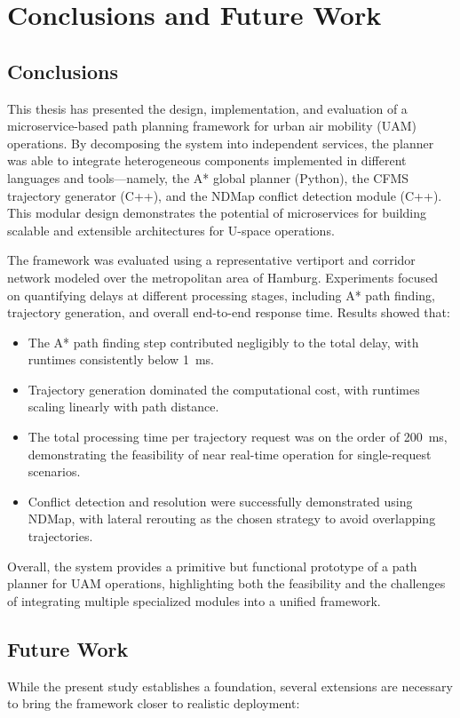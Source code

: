 \chapter{Conclusions and Future Work}
\label{s_conclusions}

\section{Conclusions}
This thesis has presented the design, implementation, and evaluation of a
microservice-based path planning framework for urban air mobility (UAM)
operations. By decomposing the system into independent services, the planner
was able to integrate heterogeneous components implemented in different
languages and tools—namely, the A* global planner (Python), the CFMS trajectory
generator (C++), and the NDMap conflict detection module (C++). This modular
design demonstrates the potential of microservices for building scalable and
extensible architectures for U-space operations.

The framework was evaluated using a representative vertiport and corridor
network modeled over the metropolitan area of Hamburg. Experiments focused on
quantifying delays at different processing stages, including A* path finding,
trajectory generation, and overall end-to-end response time. Results showed
that:
\begin{itemize}
    \item The A* path finding step contributed negligibly to the total delay,
    with runtimes consistently below 1~ms.
    \item Trajectory generation dominated the computational cost, with runtimes
    scaling linearly with path distance.
    \item The total processing time per trajectory request was on the order of
    200~ms, demonstrating the feasibility of near real-time operation for
    single-request scenarios.
    \item Conflict detection and resolution were successfully demonstrated using
    NDMap, with lateral rerouting as the chosen strategy to avoid overlapping
    trajectories.
\end{itemize}

Overall, the system provides a primitive but functional prototype of a path
planner for UAM operations, highlighting both the feasibility and the
challenges of integrating multiple specialized modules into a unified framework.

\section{Future Work}
While the present study establishes a foundation, several extensions are
necessary to bring the framework closer to realistic deployment:

